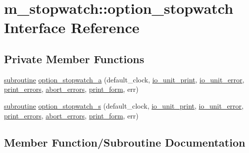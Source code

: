 \hypertarget{interfacem__stopwatch_1_1option__stopwatch}{}\section{m\+\_\+stopwatch\+:\+:option\+\_\+stopwatch Interface Reference}
\label{interfacem__stopwatch_1_1option__stopwatch}
\subsection*{Private Member Functions}
\begin{DoxyCompactItemize}
\item 
\hyperlink{M__stopwatch_83_8txt_acfbcff50169d691ff02d4a123ed70482}{subroutine} \hyperlink{interfacem__stopwatch_1_1option__stopwatch_affae4a9abb58206ca9bc6818f0e77123}{option\+\_\+stopwatch\+\_\+a} (default\+\_\+clock, \hyperlink{option__stopwatch_83_8txt_a4fe5427ea57805c6d78b77a54a002e36}{io\+\_\+unit\+\_\+print}, \hyperlink{option__stopwatch_83_8txt_a5921418297454465f26a02b350456a4b}{io\+\_\+unit\+\_\+error}, \hyperlink{option__stopwatch_83_8txt_aac742f39d25b161bfa9ac83be8041e45}{print\+\_\+errors}, \hyperlink{option__stopwatch_83_8txt_aeabdb3b9e9e255861c57d32f767aa203}{abort\+\_\+errors}, \hyperlink{option__stopwatch_83_8txt_a86ad7ca7471d1fef8c045a16cac49a65}{print\+\_\+form}, err)
\item 
\hyperlink{M__stopwatch_83_8txt_acfbcff50169d691ff02d4a123ed70482}{subroutine} \hyperlink{interfacem__stopwatch_1_1option__stopwatch_a8732d3375492140b0a18f5e78afc8f52}{option\+\_\+stopwatch\+\_\+s} (default\+\_\+clock, \hyperlink{option__stopwatch_83_8txt_a4fe5427ea57805c6d78b77a54a002e36}{io\+\_\+unit\+\_\+print}, \hyperlink{option__stopwatch_83_8txt_a5921418297454465f26a02b350456a4b}{io\+\_\+unit\+\_\+error}, \hyperlink{option__stopwatch_83_8txt_aac742f39d25b161bfa9ac83be8041e45}{print\+\_\+errors}, \hyperlink{option__stopwatch_83_8txt_aeabdb3b9e9e255861c57d32f767aa203}{abort\+\_\+errors}, \hyperlink{option__stopwatch_83_8txt_a86ad7ca7471d1fef8c045a16cac49a65}{print\+\_\+form}, err)
\end{DoxyCompactItemize}


\subsection{Member Function/\+Subroutine Documentation}
\mbox{\label{interfacem__stopwatch_1_1option__stopwatch_affae4a9abb58206ca9bc6818f0e77123}} 
